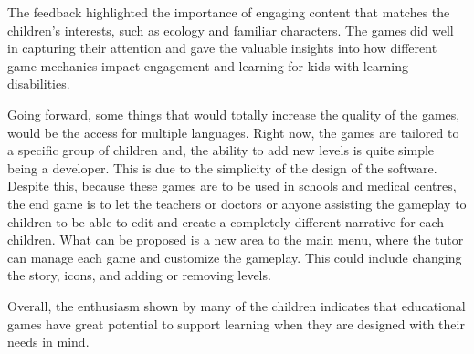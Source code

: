 The feedback highlighted the importance of engaging content that matches the children’s interests, such as ecology and familiar characters. The games did well in capturing their attention and gave the valuable insights into how different game mechanics impact engagement and learning for kids with learning disabilities.

Going forward, some things that would totally increase the quality of the games, would be the access for multiple languages. Right now, the games are tailored to a specific group of children and, the ability to add new levels is quite simple being a developer. This is due to the simplicity of the design of the software. Despite this, because these games are to be used in schools and medical centres, the end game is to let the teachers or doctors or anyone assisting the gameplay to children to be able to edit and create a completely different narrative for each children. What can be proposed is a new area to the main menu, where the tutor can manage each game and customize the gameplay. This could include changing the story, icons, and adding or removing levels.

Overall, the enthusiasm shown by many of the children indicates that educational games have great potential to support learning when they are designed with their needs in mind.

